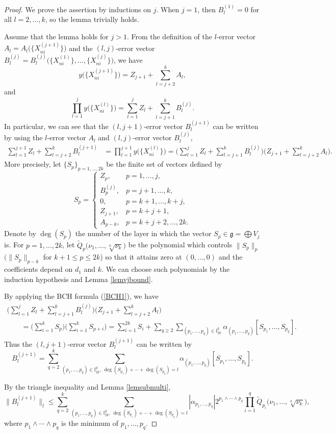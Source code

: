 \documentclass[10pt,a4paper]{amsart}
\numberwithin{equation}{section}
\newcommand{\g}{\mathfrak{g}}
\begin{document}
\begin{proof}
 We prove the assertion by inductions on $j$.
 When $j=1$,
 then $B_l^{(1)}=0$ for all $l=2,\dots,k$,
 so the lemma trivially holds.

 Assume that the lemma holds for $j>1$.
 From the definition of the $l$-error vector $A_l=A_l\big(\bigl\{X_{ni}^{(j+1)}\bigr\}\big)$ and the $(l,j)$-error vector $B_l^{(j)}=B_l^{(j)}\big(\bigl\{X_{ni}^{(1)}\bigr\},\dots,\bigl\{X_{ni}^{(j)}\bigr\}\big)$,
 we have
 \[
 y\big(\bigl\{X_{ni}^{(j+1)}\bigr\}\big)=Z_{j+1}+\sum_{l=j+2}^kA_l,
 \]
 and
 \[
 \prod_{l=1}^{j}y\big(\bigl\{X_{ni}^{(l)}\bigr\}\big)=\sum_{l=1}^{j}Z_l+\sum_{l=j+1}^kB_l^{(j)}.
 \]
 In particular,
 we can see that the $(l,j+1)$-error vector $B_l^{(j+1)}$ can be written by using the $l$-error vector $A_l$ and $(l,j)$-error vector $B_l^{(j)}$,
 \begin{align*}
\sum_{l=1}^{j+1}Z_l+\sum_{l=j+2}^kB_l^{(j+1)}
 &=\prod_{l=1}^{j+1}y\big(\bigl\{X_{ni}^{(l)}\bigr\}\big)
 =\Bigg(\sum_{l=1}^{j}Z_l+\sum_{l=j+1}^kB_l^{(j)}\Bigg)\Bigg(Z_{j+1}+\sum_{l=j+2}^kA_l\Bigg).
 \end{align*}
 More precisely,
 let $\{S_p\}_{p=1,\dots,2k}$ be the finite set of vectors defined by
 \[
 S_p=\begin{cases}
 Z_p, & p=1,\dots,j,
 \\
 B_p^{(j)}, & p=j+1,\dots,k,
 \\
 0, & p=k+1,\dots,k+j,
 \\
 Z_{j+1}, & p=k+j+1,
 \\
 A_{p-k}, & p=k+j+2,\dots,2k.
 \end{cases}
 \]
 Denote by $\deg(S_p)$ the number of the layer in which the vector $S_p\in\g=\bigoplus V_j$ is.
 For $p=1,\dots,2k$,
let $\tilde{Q}_p\big(\nu_1,\dots,\sqrt[k]{\nu_k}\big)$ be the polynomial which controls $\|S_p\|_p$ $(\|S_p\|_{p-k}$ for $k+1\leq p\allowbreak\leq 2k$) so that it attains zero at $(0,\dots,0)$ and the coefficients depend on $d_1$ and $k$.
We can choose such polynomials by the induction hypothesis and Lemma \ref{lemvjbound}.

 By applying the BCH formula (\ref{BCH1}),
 we have
 \begin{gather*}
 \Bigg(\sum_{l=1}^{j}Z_l+\sum_{l=j+1}^kB_l^{(j)}\Bigg)\Bigg(Z_{j+1}+\sum_{l=j+2}^kA_l\Bigg)
 \\ \qquad
{} = \Bigg(\sum_{i=1}^kS_p\Bigg)\Bigg(\sum_{i=1}^{k}S_{p+i}\Bigg)
 =\sum_{i=1}^{2k}S_i+\sum_{q\geq 2}\sum_{(p_1,\dots,p_q)\in \mathbb{I}_{2k}^q}\alpha_{(p_1,\dots,p_q)}[S_{p_1},\dots,S_{p_q}].
 \end{gather*}
 Thus the $(l,j+1)$-error vector $B_l^{(j+1)}$ can be written by
 \[
 B_l^{(j+1)}=\sum_{q=2}^k\sum_{(p_1,\dots,p_q)\in\mathbb{I}_{2k}^q,\, \deg(S_{p_1})+\cdots+\deg(S_{p_q})=l}\alpha_{(p_1,\dots,p_q)}[S_{p_1},\dots,S_{p_q}].
 \]

 By the triangle inequality and Lemma \ref{lemsubmulti},
 \[
 \big\|B_l^{(j+1)}\big\|_l\leq \sum_{q=2}^k\sum_{(p_1,\dots,p_q)\in\mathbb{I}_{2k}^q,\,\deg(S_{p_1}) +\cdots+\deg(S_{p_q})=l}|\alpha_{p_1,\dots,p_q}|2^{p_1\wedge\cdots\wedge p_q}\prod_{i=1}^q\tilde{Q}_{p_i}\big(\nu_1,\dots,\sqrt[k]{\nu_k}\big),
 \]
 where $p_1\wedge\cdots\wedge p_q$ is the minimum of $p_1,\dots,p_q$.
\end{proof}
\end{document}
